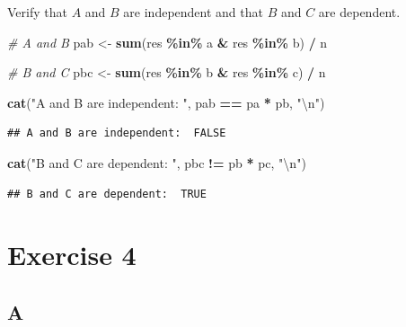 \documentclass[
]{article}
\newenvironment{Shaded}{\begin{snugshade}}{\end{snugshade}}
\newcommand{\CharTok}[1]{\textcolor[rgb]{0.31,0.60,0.02}{#1}}
\newcommand{\CommentTok}[1]{\textcolor[rgb]{0.56,0.35,0.01}{\textit{#1}}}
\newcommand{\KeywordTok}[1]{\textcolor[rgb]{0.13,0.29,0.53}{\textbf{#1}}}
\newcommand{\NormalTok}[1]{#1}
\newcommand{\OperatorTok}[1]{\textcolor[rgb]{0.81,0.36,0.00}{\textbf{#1}}}
\newcommand{\StringTok}[1]{\textcolor[rgb]{0.31,0.60,0.02}{#1}}
\begin{document}
Verify that \(A\) and \(B\) are independent and that \(B\) and \(C\) are
dependent.

\begin{Shaded}
\begin{Highlighting}[]
\CommentTok{\# A and B}
\NormalTok{pab \textless{}{-}}\StringTok{ }\KeywordTok{sum}\NormalTok{(res }\OperatorTok{\%in\%}\StringTok{ }\NormalTok{a }\OperatorTok{\&}\StringTok{ }\NormalTok{res }\OperatorTok{\%in\%}\StringTok{ }\NormalTok{b) }\OperatorTok{/}\StringTok{ }\NormalTok{n}

\CommentTok{\# B and C}
\NormalTok{pbc \textless{}{-}}\StringTok{ }\KeywordTok{sum}\NormalTok{(res }\OperatorTok{\%in\%}\StringTok{ }\NormalTok{b }\OperatorTok{\&}\StringTok{ }\NormalTok{res }\OperatorTok{\%in\%}\StringTok{ }\NormalTok{c) }\OperatorTok{/}\StringTok{ }\NormalTok{n}

\KeywordTok{cat}\NormalTok{(}\StringTok{"A and B are independent: "}\NormalTok{, pab }\OperatorTok{==}\StringTok{ }\NormalTok{pa }\OperatorTok{*}\StringTok{ }\NormalTok{pb, }\StringTok{"}\CharTok{\textbackslash{}n}\StringTok{"}\NormalTok{)}
\end{Highlighting}
\end{Shaded}

\begin{verbatim}
## A and B are independent:  FALSE
\end{verbatim}

\begin{Shaded}
\begin{Highlighting}[]
\KeywordTok{cat}\NormalTok{(}\StringTok{"B and C are dependent: "}\NormalTok{, pbc }\OperatorTok{!=}\StringTok{ }\NormalTok{pb }\OperatorTok{*}\StringTok{ }\NormalTok{pc, }\StringTok{"}\CharTok{\textbackslash{}n}\StringTok{"}\NormalTok{)}
\end{Highlighting}
\end{Shaded}

\begin{verbatim}
## B and C are dependent:  TRUE
\end{verbatim}

\hypertarget{exercise-4}{%
\section{Exercise 4}\label{exercise-4}}

\hypertarget{a-3}{%
\subsection{A}\label{a-3}}
\end{document}
